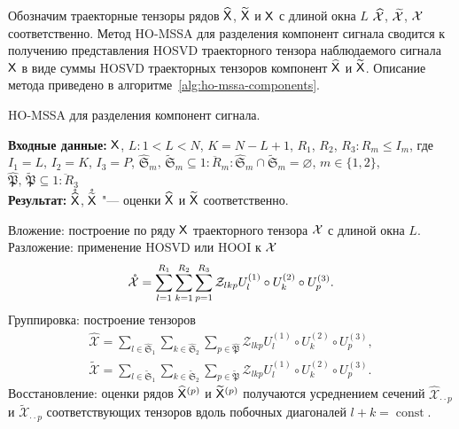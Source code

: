 \documentclass[specialist,
  substylefile=spbu_report.rtx,
subf,href,colorlinks=true, 12pt]{disser}
\theoremstyle{plain}
\theoremstyle{definition}
\theoremstyle{remark}
\newcommand{\Input}{\textbf{Входные данные: }}
\newcommand{\Output}{\textbf{Результат: }}
\begin{document}
Обозначим траекторные тензоры рядов $\widehat{\mathsf{X}}$,
$\widetilde{\mathsf{X}}$ и $\mathsf{X}$ с длиной окна $L$
$\widehat{\mathcal{X}}$, $\widetilde{\mathcal{X}}$, $\mathcal{X}$ соответственно.
Метод HO-MSSA для разделения компонент сигнала сводится к
получению представления HOSVD траекторного тензора
наблюдаемого сигнала $\mathsf{X}$ в виде суммы HOSVD траекторных тензоров
компонент $\widehat{\mathsf{X}}$ и $\widetilde{\mathsf{X}}$.
Описание метода приведено в алгоритме~\ref{alg:ho-mssa-components}.
\begin{algorithm}[!ht]
  \caption{HO-MSSA для разделения компонент сигнала.}
  \label{alg:ho-mssa-components}
  \Input $\mathsf{X}$,
  $L: 1< L < N$, $K = N - L + 1$,
  $R_1$, $R_2$, $R_3: R_m \leqslant I_m$, где $I_1=L$, $I_2=K$, $I_3=P$,
  $\widehat{\mathfrak{S}}_m,\, \widetilde{\mathfrak{S}}_m \subseteq
  \overline{1:R_m}:
  \widehat{\mathfrak{S}}_m \cap \widetilde{\mathfrak{S}}_m = \varnothing$,
  $m \in \{1, 2\}$,
  $\widehat{\mathfrak{P}},\, \widetilde{\mathfrak{P}}  \subseteq
  \overline{1:R_3}$\\
  \Output $\mathring{\widehat{\mathsf{X}}}$, $\mathring{\widetilde{\mathsf{X}}}$
  "--- оценки $\widehat{\mathsf{X}}$ и $\widetilde{\mathsf{X}}$
  соответственно.
  \begin{algorithmic}[1]
    \State Вложение: построение по ряду $\mathsf{X}$ траекторного тензора $\mathcal{X}$
    с длиной окна $L$. \label{algstep:ho-mssa-inj}
    \State Разложение: применение HOSVD или HOOI к $\mathcal{X}$
    \label{algstep:ho-mssa-decomp}
    \begin{equation*}
      \mathring{\mathcal{X}} = \sum_{l=1}^{R_1} \sum_{k=1}^{R_2} \sum_{p=1}^{R_3}
      \mathcal{Z}_{lkp} U_l^{(1)}\circ U_k^{(2)} \circ U_p^{(3)}.
      \label{eq:ho-mssa}
    \end{equation*}
    \State Группировка: построение тензоров
    \begin{gather*}
      \widehat{\mathcal{X}}=\sum_{l \in \widehat{\mathfrak{S}}_1}
      \sum_{k\in \widehat{\mathfrak{S}}_2}
      \sum_{p\in \widehat{\mathfrak{P}}}
      \mathcal{Z}_{lkp} U^{(1)}_{l}\circ U^{(2)}_{k} \circ U^{(3)}_{p},\\
      \widetilde{\mathcal{X}}=\sum_{l \in \widetilde{\mathfrak{S}}_1}
      \sum_{k\in \widetilde{\mathfrak{S}}_2}
      \sum_{p\in \widetilde{\mathfrak{P}}}
      \mathcal{Z}_{lkp} U^{(1)}_{l}\circ U^{(2)}_{k} \circ U^{(3)}_{p}.
    \end{gather*}
    \State %
    Восстановление: оценки рядов $\widehat{\mathsf{X}}^{(p)}$ и
    $\widetilde{\mathsf{X}}^{(p)}$ получаются усреднением сечений
    $\widehat{\mathcal{X}}_{\cdot \cdot p}$
    и $\widetilde{\mathcal{X}}_{\cdot\cdot p}$ соответствующих
    тензоров вдоль побочных диагоналей $l+k = \operatorname{const}$.
  \end{algorithmic}
\end{algorithm}
\end{document}
